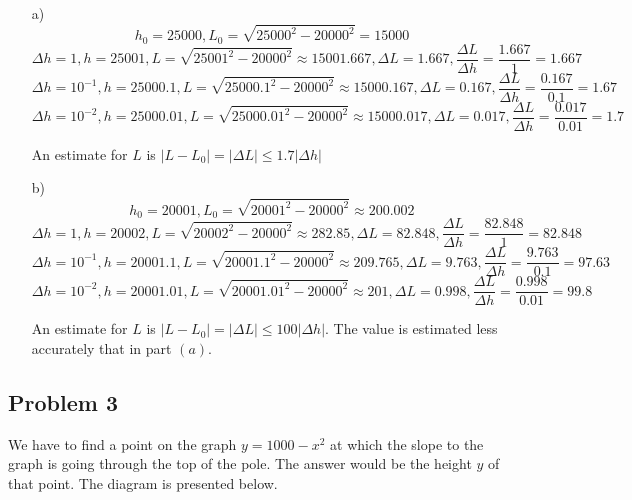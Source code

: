\documentclass{article}
\begin{document}
\begin{itemize}
    \item[a)] 
\[h_0 = 25000, L_0 = \sqrt{25000^2-20000^2} = 15000\]
\[\Delta h = 1, h = 25001, L = \sqrt{25001^2-20000^2} \approx 15001.667, \Delta L = 1.667, \frac{\Delta L}{\Delta h} = \frac{1.667}{1} = 1.667\]
\[\Delta h = 10^{-1}, h = 25000.1, L = \sqrt{25000.1^2-20000^2} \approx 15000.167, \Delta L = 0.167, \frac{\Delta L}{\Delta h} = \frac{0.167}{0.1} = 1.67\]
\[\Delta h = 10^{-2}, h = 25000.01, L = \sqrt{25000.01^2-20000^2} \approx 15000.017, \Delta L = 0.017, \frac{\Delta L}{\Delta h} = \frac{0.017}{0.01} = 1.7\]

An estimate for $L$ is $|L-L_0| = |\Delta L| \leq 1.7|\Delta h|$

    \item[b)]
\[h_0 = 20001, L_0 = \sqrt{20001^2-20000^2} \approx 200.002\]
\[\Delta h = 1, h = 20002, L = \sqrt{20002^2-20000^2} \approx 282.85, \Delta L = 82.848, \frac{\Delta L}{\Delta h} = \frac{82.848}{1} = 82.848\]
\[\Delta h = 10^{-1}, h = 20001.1, L = \sqrt{20001.1^2-20000^2} \approx 209.765, \Delta L = 9.763, \frac{\Delta L}{\Delta h} = \frac{9.763}{0.1} = 97.63\]
\[\Delta h = 10^{-2}, h = 20001.01, L = \sqrt{20001.01^2-20000^2} \approx 201, \Delta L = 0.998, \frac{\Delta L}{\Delta h} = \frac{0.998}{0.01} = 99.8\]

An estimate for $L$ is $|L-L_0| = |\Delta L| \leq 100|\Delta h|$. The value is estimated less accurately that in part $(a)$.
\end{itemize}    
\subsection{Problem 3}

We have to find a point on the graph $y=1000-x^2$ at which the slope to the graph is going through the top of the pole. The answer would be the height $y$ of that point. The diagram is presented below.
\\
\\

\end{document}
